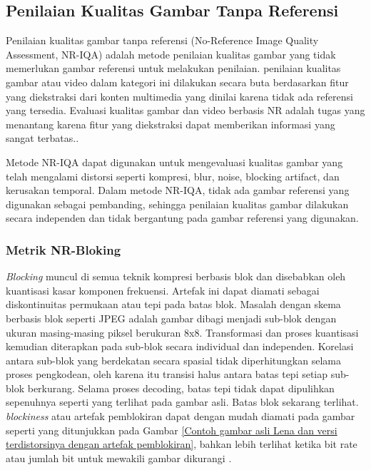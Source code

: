 \subsection{Penilaian Kualitas Gambar Tanpa Referensi}
\hspace{1,2cm}
Penilaian kualitas gambar tanpa referensi (No-Reference Image Quality Assessment, NR-IQA) adalah metode penilaian kualitas gambar yang tidak memerlukan gambar referensi untuk melakukan penilaian. penilaian kualitas gambar atau video dalam kategori ini dilakukan secara buta berdasarkan fitur yang diekstraksi dari konten multimedia yang dinilai karena tidak ada referensi yang tersedia. Evaluasi kualitas gambar dan video berbasis NR adalah tugas yang menantang karena fitur yang diekstraksi dapat memberikan informasi yang sangat terbatas.\citep{Dost2022}. 

Metode NR-IQA dapat digunakan untuk mengevaluasi kualitas gambar yang telah mengalami distorsi seperti kompresi, blur, noise, blocking artifact, dan kerusakan temporal. Dalam metode NR-IQA, tidak ada gambar referensi yang digunakan sebagai pembanding, sehingga penilaian kualitas gambar dilakukan secara independen dan tidak bergantung pada gambar referensi yang digunakan.

\subsubsection{Metrik NR-Bloking}

\textit{Blocking} muncul di semua teknik kompresi berbasis blok dan disebabkan oleh kuantisasi kasar komponen frekuensi. Artefak ini dapat diamati sebagai diskontinuitas permukaan atau tepi pada batas blok. Masalah dengan skema berbasis blok seperti JPEG adalah gambar dibagi menjadi sub-blok dengan ukuran masing-masing piksel berukuran 8x8. Transformasi dan proses kuantisasi kemudian diterapkan pada sub-blok secara individual dan independen. Korelasi antara sub-blok yang berdekatan secara spasial tidak diperhitungkan selama proses pengkodean, oleh karena itu transisi halus antara batas tepi setiap sub-blok berkurang. Selama proses decoding, batas tepi tidak dapat dipulihkan sepenuhnya seperti yang terlihat pada gambar asli. Batas blok sekarang terlihat. \textit{blockiness} atau artefak pemblokiran dapat dengan mudah diamati pada gambar seperti yang ditunjukkan pada Gambar \ref{Contoh gambar asli Lena dan versi terdistorsinya dengan artefak pemblokiran}, bahkan lebih terlihat ketika bit rate atau jumlah bit untuk mewakili gambar dikurangi \citep{Kusuma2005}.

